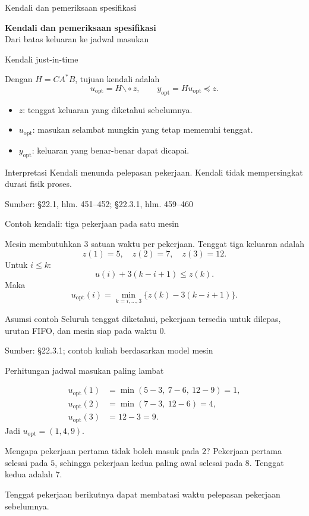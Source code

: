 \documentclass[aspectratio=169,11pt]{beamer}
\newcommand{\source}[1]{%
    \vfill
    \hfill{\tiny\color{gray}Sumber: #1}
}
\newcommand{\res}{\mathbin{\backslash\!\circ}}
\begin{document}
\begin{frame}{Kendali dan pemeriksaan spesifikasi}
\begin{center}{\LARGE\bfseries\color{AcademicBlue}Kendali dan pemeriksaan spesifikasi}\\[8mm]Dari batas keluaran ke jadwal masukan\end{center}
\end{frame}
\begin{frame}{Kendali just-in-time}


Dengan $H=CA^*B$, tujuan kendali adalah
\[
u_{\mathrm{opt}}=H\res z,\qquad
y_{\mathrm{opt}}=Hu_{\mathrm{opt}}\preceq z.
\]
\begin{itemize}
\item $z$: tenggat keluaran yang diketahui sebelumnya.
\item $u_{\mathrm{opt}}$: masukan selambat mungkin yang tetap memenuhi tenggat.
\item $y_{\mathrm{opt}}$: keluaran yang benar-benar dapat dicapai.
\end{itemize}
\begin{block}{Interpretasi}
Kendali menunda pelepasan pekerjaan. Kendali tidak mempersingkat durasi fisik proses.
\end{block}

\source{\S22.1, hlm. 451--452; \S22.3.1, hlm. 459--460}

\end{frame}
\begin{frame}{Contoh kendali: tiga pekerjaan pada satu mesin}


Mesin membutuhkan $3$ satuan waktu per pekerjaan.
Tenggat tiga keluaran adalah
\[
z(1)=5,\quad z(2)=7,\quad z(3)=12.
\]
Untuk $i\le k$:
\[
u(i)+3(k-i+1)\le z(k).
\]
Maka
\[
u_{\mathrm{opt}}(i)=\min_{k=i,\ldots,3}
\{z(k)-3(k-i+1)\}.
\]
\begin{block}{Asumsi contoh}
Seluruh tenggat diketahui, pekerjaan tersedia untuk dilepas,
urutan FIFO, dan mesin siap pada waktu $0$.
\end{block}

\source{\S22.3.1; contoh kuliah berdasarkan model mesin}

\end{frame}
\begin{frame}{Perhitungan jadwal masukan paling lambat}


\begin{align*}
u_{\mathrm{opt}}(1)&=\min(5-3,\ 7-6,\ 12-9)=1,\\
u_{\mathrm{opt}}(2)&=\min(7-3,\ 12-6)=4,\\
u_{\mathrm{opt}}(3)&=12-3=9.
\end{align*}
Jadi $u_{\mathrm{opt}}=(1,4,9)$.
\begin{exampleblock}{Mengapa pekerjaan pertama tidak boleh masuk pada $2$?}
Pekerjaan pertama selesai pada $5$, sehingga pekerjaan kedua paling awal
selesai pada $8$. Tenggat kedua adalah $7$.
\end{exampleblock}
Tenggat pekerjaan berikutnya dapat membatasi waktu pelepasan pekerjaan sebelumnya.


\end{frame}
\end{document}
